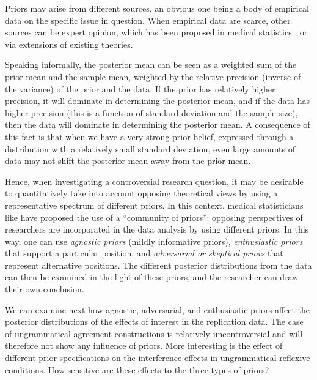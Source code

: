 \documentclass{cambridge7A}\usepackage[]{graphicx}\usepackage[]{color}
\begin{document}
Priors may arise from different sources, an obvious one being a body of empirical data on the specific issue in question.  When empirical data are scarce, other sources can be  expert opinion, which has been proposed in medical statistics \citep{ohagan2006uncertain,OakleyOHagan}, or via extensions of existing theories.  

Speaking informally, the posterior mean can be seen as a weighted sum of the prior mean and the sample mean, weighted by the relative precision (inverse of the variance) of the prior and the data. If the prior has relatively higher precision, it will dominate in determining the posterior mean, and if the data has higher precision (this is a function of standard deviation and the sample size), then the data will dominate in determining the posterior mean. A consequence of this fact is that when we have a very strong prior belief, expressed through a distribution with a relatively small standard deviation, even large amounts of data may not shift the posterior mean away from the prior mean. 

Hence, when investigating a controversial research question, it may be desirable to quantitatively take into account opposing theoretical views by using a representative spectrum of different priors. In this context, medical statisticians like \cite{spiegelhalter2004bayesian} have proposed the use of a  ``community of priors'': opposing perspectives of researchers are  incorporated in the data analysis by using different priors.  In this way, one can use  \textit{agnostic priors} (mildly informative priors), \textit{enthusiastic priors} that support a particular position, and   \textit{adversarial or skeptical priors} that represent alternative positions. The different posterior distributions from the data can then be examined in the light of these priors, and the researcher can draw their own conclusion. 

We can examine next how agnostic, adversarial, and enthusiastic priors affect the posterior distributions of the effects of interest in the replication data. 
The case of ungrammatical agreement constructions is relatively uncontroversial and will therefore not show any influence of priors. 
More interesting is the effect of different prior specifications on the interference effects in ungrammatical reflexive conditions. How sensitive are these effects to the three types of priors?
\end{document}
